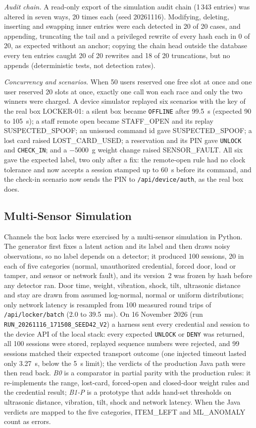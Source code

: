 \documentclass[sigconf,screen]{acmart}
\begin{document}
\textit{Audit chain.} A read-only export of the simulation audit chain (1\,343 entries) was altered in seven ways,
20 times each (seed 20261116). Modifying, deleting, inserting and swapping inner entries were each detected in 20 of
20 cases, and appending, truncating the tail and a privileged rewrite of every hash each in 0 of 20, as expected
without an anchor; copying the chain head outside the database every ten entries caught 20 of 20 rewrites and 18 of 20
truncations, but no appends (deterministic tests, not detection rates).

\textit{Concurrency and scenarios.} When 50 users reserved one free slot at once and one user reserved 20 slots at
once, exactly one call won each race and only the two winners were charged. A device simulator replayed six scenarios
with the key of the real box LOCKER-01: a silent box became \texttt{OFFLINE} after 99.5~s (expected 90 to 105~s); a
staff remote open became STAFF\_OPEN and its replay SUSPECTED\_SPOOF; an unissued command id gave SUSPECTED\_SPOOF; a
lost card raised LOST\_CARD\_USED; a reservation and its PIN gave \texttt{UNLOCK} and \texttt{CHECK\_IN}; and a
$-5000$~g weight change raised SENSOR\_FAULT. All six gave the expected label, two only after a fix: the remote-open
rule had no clock tolerance and now accepts a session stamped up to 60~s before its command, and the check-in scenario
now sends the PIN to \texttt{/api/device/auth}, as the real box does.

\subsection{Multi-Sensor Simulation}\label{sec:sim_eval}

Channels the box lacks were exercised by a multi-sensor simulation in Python. The generator first fixes a latent
action and its label and then draws noisy observations, so no label depends on a detector; it produced 100 sessions,
20 in each of five categories (normal, unauthorized credential, forced door, load or tamper, and sensor or network
fault), and its version~2 was frozen by hash before any detector ran. Door time, weight, vibration, shock, tilt,
ultrasonic distance and stay are drawn from assumed log-normal, normal or uniform distributions; only network latency
is resampled from 100 measured round trips of \texttt{/api/locker/batch} (2.0 to 39.5~ms). On 16 November 2026 (run
\texttt{RUN\_20261116\_171508\_SEED42\_V2}) a harness sent every credential and session to the device API of the local
stack: every expected \texttt{UNLOCK} or \texttt{DENY} was returned, all 100 sessions were stored, replayed sequence
numbers were rejected, and 99 sessions matched their expected transport outcome (one injected timeout lasted only
3.27~s, below the 5~s limit); the verdicts of the production Java path were then read back. \emph{B0} is a comparator
in partial parity with the production rules: it re-implements the range, lost-card, forced-open and closed-door weight
rules and the credential result; \emph{B1-P} is a prototype that adds hand-set thresholds on ultrasonic distance,
vibration, tilt, shock and network latency. When the Java verdicts are mapped to the five categories, ITEM\_LEFT and
ML\_ANOMALY count as errors.
\end{document}
